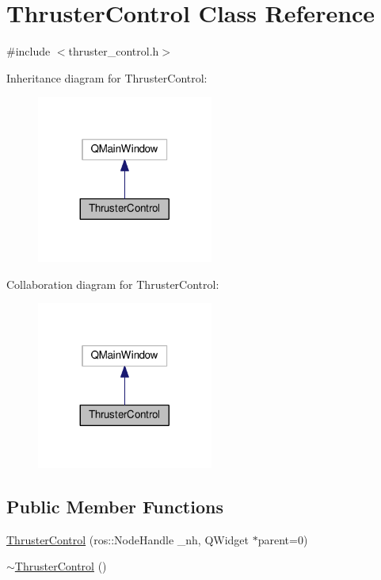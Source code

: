 \hypertarget{classThrusterControl}{}\section{Thruster\+Control Class Reference}
\label{classThrusterControl}


{\ttfamily \#include $<$thruster\+\_\+control.\+h$>$}



Inheritance diagram for Thruster\+Control\+:\nopagebreak
\begin{figure}[H]
\begin{center}
\leavevmode
\includegraphics[width=164pt]{classThrusterControl__inherit__graph}
\end{center}
\end{figure}


Collaboration diagram for Thruster\+Control\+:\nopagebreak
\begin{figure}[H]
\begin{center}
\leavevmode
\includegraphics[width=164pt]{classThrusterControl__coll__graph}
\end{center}
\end{figure}
\subsection*{Public Member Functions}
\begin{DoxyCompactItemize}
\item 
\hyperlink{classThrusterControl_a88e603d8a1fa620a60a9989cce8e4c87}{Thruster\+Control} (ros\+::\+Node\+Handle \+\_\+nh, Q\+Widget $\ast$parent=0)
\item 
\hyperlink{classThrusterControl_a2d6947c1e460086a6bbfbee2b1bd86e8}{$\sim$\+Thruster\+Control} ()
\end{DoxyCompactItemize}

